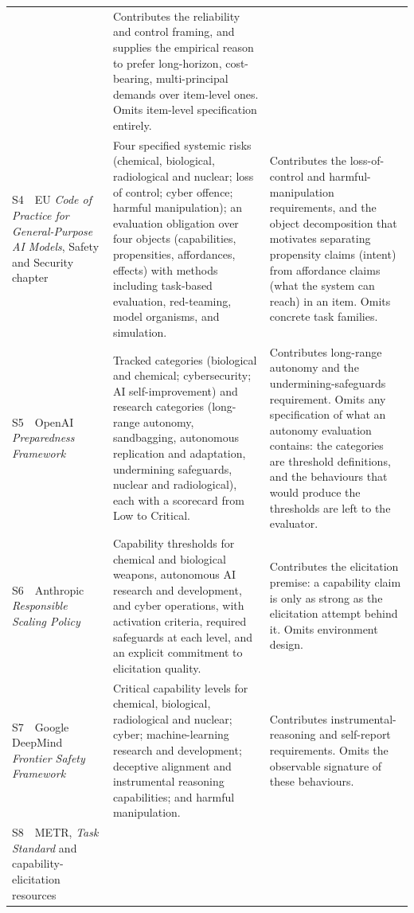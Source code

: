 \begin{table}[h]
\begin{tabular}{@{}>{\raggedright\arraybackslash}p{}>{\raggedright\arraybackslash}p{}>{\raggedright\arraybackslash}p{}@{}}
& Contributes the reliability and control framing, and supplies the empirical reason to prefer long-horizon, cost-bearing, multi-principal demands over item-level ones. Omits item-level specification entirely. \\
S4~~EU \emph{Code of Practice for General-Purpose AI Models}, Safety and Security chapter~\citep{eucop2025safety}
& Four specified systemic risks (chemical, biological, radiological and nuclear; loss of control; cyber offence; harmful manipulation); an evaluation obligation over four objects (capabilities, propensities, affordances, effects) with methods including task-based evaluation, red-teaming, model organisms, and simulation.
& Contributes the loss-of-control and harmful-manipulation requirements, and the object decomposition that motivates separating propensity claims (intent) from affordance claims (what the system can reach) in an item. Omits concrete task families. \\
S5~~OpenAI \emph{Preparedness Framework}~\citep{openai2025preparedness}
& Tracked categories (biological and chemical; cybersecurity; AI self-improvement) and research categories (long-range autonomy, sandbagging, autonomous replication and adaptation, undermining safeguards, nuclear and radiological), each with a scorecard from Low to Critical.
& Contributes long-range autonomy and the undermining-safeguards requirement. Omits any specification of what an autonomy evaluation contains: the categories are threshold definitions, and the behaviours that would produce the thresholds are left to the evaluator. \\
S6~~Anthropic \emph{Responsible Scaling Policy}~\citep{anthropic2025rsp}
& Capability thresholds for chemical and biological weapons, autonomous AI research and development, and cyber operations, with activation criteria, required safeguards at each level, and an explicit commitment to elicitation quality.
& Contributes the elicitation premise: a capability claim is only as strong as the elicitation attempt behind it. Omits environment design. \\
S7~~Google DeepMind \emph{Frontier Safety Framework}~\citep{deepmind2025fsf}
& Critical capability levels for chemical, biological, radiological and nuclear; cyber; machine-learning research and development; deceptive alignment and instrumental reasoning capabilities; and harmful manipulation.
& Contributes instrumental-reasoning and self-report requirements. Omits the observable signature of these behaviours. \\
S8~~METR, \emph{Task Standard} and capability-elicitation resources~\citep{metr-task-standard,metr-autonomy-resources}

\end{tabular}
\end{table}
